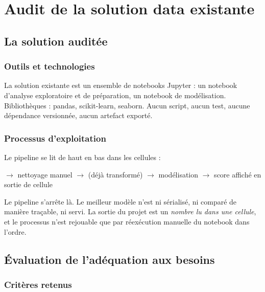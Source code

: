 \section{Audit de la solution data existante}

\subsection{La solution auditée}

\subsubsection*{Outils et technologies}

La solution existante est un ensemble de notebooks Jupyter : un notebook
d'analyse exploratoire et de préparation, un notebook de modélisation.
Bibliothèques : pandas, scikit-learn, seaborn. Aucun script, aucun test, aucune
dépendance versionnée, aucun artefact exporté.

\subsubsection*{Processus d'exploitation}

Le pipeline se lit de haut en bas dans les cellules :

\begin{center}
\small
{} $\rightarrow$ nettoyage manuel $\rightarrow$ 
(déjà transformé) $\rightarrow$ modélisation $\rightarrow$ score affiché en sortie de cellule
\end{center}

Le pipeline s'arrête là. Le meilleur modèle n'est ni sérialisé, ni comparé de
manière traçable, ni servi. La sortie du projet est un \emph{nombre lu dans une
cellule}, et le processus n'est rejouable que par réexécution manuelle du
notebook dans l'ordre.

\subsection{Évaluation de l'adéquation aux besoins}

\subsubsection*{Critères retenus}


